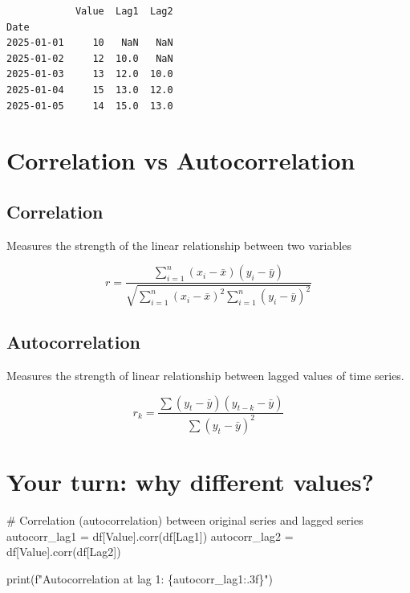 \documentclass[
  11pt,
  a4paper,
]{report}
\newenvironment{Shaded}{\begin{snugshade}}{\end{snugshade}}
\newcommand{\BuiltInTok}[1]{\textcolor[rgb]{0.00,0.23,0.31}{#1}}
\newcommand{\CommentTok}[1]{\textcolor[rgb]{0.37,0.37,0.37}{#1}}
\newcommand{\NormalTok}[1]{\textcolor[rgb]{0.00,0.23,0.31}{#1}}
\newcommand{\OperatorTok}[1]{\textcolor[rgb]{0.37,0.37,0.37}{#1}}
\newcommand{\SpecialCharTok}[1]{\textcolor[rgb]{0.37,0.37,0.37}{#1}}
\newcommand{\SpecialStringTok}[1]{\textcolor[rgb]{0.13,0.47,0.30}{#1}}
\newcommand{\StringTok}[1]{\textcolor[rgb]{0.13,0.47,0.30}{#1}}
\begin{document}
\begin{verbatim}
            Value  Lag1  Lag2
Date                         
2025-01-01     10   NaN   NaN
2025-01-02     12  10.0   NaN
2025-01-03     13  12.0  10.0
2025-01-04     15  13.0  12.0
2025-01-05     14  15.0  13.0
\end{verbatim}

\section{Correlation vs
Autocorrelation}\label{correlation-vs-autocorrelation}

\subsection{Correlation}\label{correlation}

Measures the strength of the linear relationship between two variables

\[r = \frac{\sum_{i=1}^{n} (x_i -\bar{x})(y_i-\bar{y})}{\sqrt{\sum_{i=1}^{n} (x_i -\bar{x})^2 \sum_{i=1}^{n} (y_i -\bar{y})^2}}\]

\subsection{Autocorrelation}\label{autocorrelation}

Measures the strength of linear relationship between lagged values of
time series.

\[r_k = \frac{\sum (y_t -\bar{y})(y_{t-k}-\bar{y})}{\sum (y_t -\bar{y})^2}\]

\section{Your turn: why different
values?}\label{your-turn-why-different-values}

\begin{Shaded}
\begin{Highlighting}[]
\CommentTok{\# Correlation (autocorrelation) between original series and lagged series}
\NormalTok{autocorr\_lag1 }\OperatorTok{=}\NormalTok{ df[}\StringTok{\textquotesingle{}Value\textquotesingle{}}\NormalTok{].corr(df[}\StringTok{\textquotesingle{}Lag1\textquotesingle{}}\NormalTok{])}
\NormalTok{autocorr\_lag2 }\OperatorTok{=}\NormalTok{ df[}\StringTok{\textquotesingle{}Value\textquotesingle{}}\NormalTok{].corr(df[}\StringTok{\textquotesingle{}Lag2\textquotesingle{}}\NormalTok{])}

\BuiltInTok{print}\NormalTok{(}\SpecialStringTok{f"Autocorrelation at lag 1: }\SpecialCharTok{\{}\NormalTok{autocorr\_lag1}\SpecialCharTok{:.3f\}}\SpecialStringTok{"}\NormalTok{)}
\end{Highlighting}
\end{Shaded}
\end{document}
